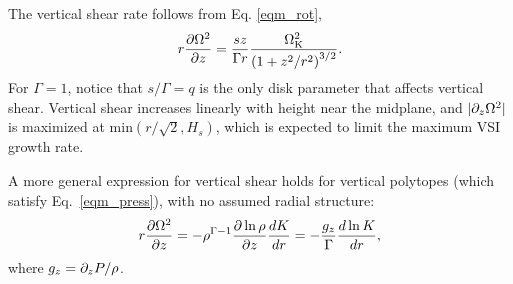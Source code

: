 The vertical shear rate follows from Eq. \ref{eqm_rot}, 
\begin{align}
  r\frac{\partial\Omega^2}{\partial z} = \frac{sz}{\Gamma r}  \frac{\Omega_{\rm K}^2}{
    \left(1+z^2/r^2\right)^{3/2}} . \label{vertical_shear_ex} 
\end{align}
For $\Gamma = 1$, notice that $s/\Gamma = q$ is the only disk parameter that affects vertical shear.
Vertical shear increases linearly with height near the midplane, and $|\partial_z \Omega^2|$ is maximized at
$\mathrm{min}(r/\sqrt{2},H_s)$, which is expected to limit the maximum VSI growth rate. 

A more general expression for vertical shear holds for vertical polytopes 
(which satisfy Eq.\ \ref{eqm_press}), with no assumed radial structure:
\begin{align}
  r\frac{\partial\Omega^2}{\partial z} = - \rho^{\Gamma-1}\frac{\partial\ln\rho}{\partial
    z}\frac{dK}{dr} = - \frac{g_z}{\Gamma}\frac{d\ln K}{dr}, \label{vertical_shear}
\end{align}
where $g_z = \partial_z P/\rho$.





